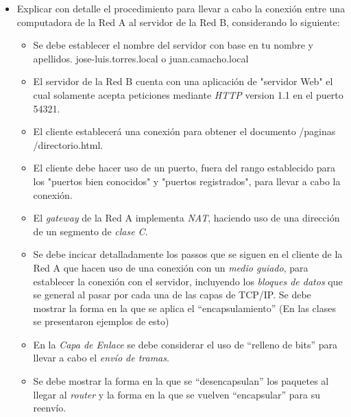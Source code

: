 \documentclass[spanish,12pt,letterpaper]{article}
\begin{document}
\begin{itemize}
\item Explicar con detalle el procedimiento para llevar a cabo la conexión entre
  una computadora de la Red A al servidor de la Red B, considerando lo siguiente:
  \begin{itemize}
  \item Se debe establecer el nombre del servidor con base en tu nombre y
    apellidos.    
    jose-luis.torres.local o juan.camacho.local
  \item El servidor de la Red B cuenta con una aplicación de "servidor Web" el
    cual solamente acepta peticiones mediante \textit{HTTP} version 1.1 en el
    puerto 54321.
  \item El cliente establecerá una conexión para obtener el documento /paginas
    /directorio.html.
  \item El cliente debe hacer uso de un puerto, fuera del rango establecido para
    los "puertos bien conocidos" y "puertos registrados", para llevar a cabo la
    conexión.
  \item El \textit{gateway} de la Red A implementa \textit{NAT}, haciendo uso de
    una dirección de un segmento de \textit{clase C}.
  \item Se debe incicar detalladamente los passos que se siguen en el cliente de
    la Red A que hacen uso de una conexión con un \textit{medio guiado}, para
    establecer la conexión con el servidor, incluyendo los \textit{bloques de
      datos} que se general al pasar por cada una de las capas de TCP/IP. Se debe
    mostrar la forma en la que se aplica el ``encapsulamiento'' (En las clases se
    presentaron ejemplos de esto)
  \item En la \textit{Capa de Enlace} se debe considerar el uso de ``relleno de
    bits'' para llevar a cabo el \textit{envío de tramas}.
  \item Se debe mostrar la forma en la que se ``desencapsulan'' los paquetes al
    llegar al \textit{router} y la forma en la que se vuelven ``encapsular'' para
    su reenvío.
  \end{itemize}


\end{itemize}
\end{document}
